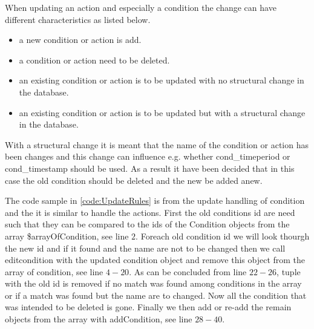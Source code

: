 When updating an action and especially a condition the change can have different characteristics as listed below.

\begin{itemize}
	\item a new condition or action is add.
	\item a condition or action need to be deleted.
	\item an existing condition or action is to be updated with no structural change in the database.
	\item an existing condition or action is to be updated but with a structural change in the database.
\end{itemize}

With a structural change it is meant that the name of the condition or action has been changes and this change can influence e.g. whether cond\_timeperiod or cond\_timestamp should be used. As a result it have been decided that in this case the old condition should be deleted and the new be added anew. 

The code sample in \ref{code:UpdateRules} is from the update handling of condition and the it is similar to handle the actions. First the old conditions id are need such that they can be compared to the ids of the Condition objects from the array \$arrayOfCondition, see line $2$. 
Foreach old condition id we will look thourgh the new id and if it found and the name are not to be changed then we call editcondition with the updated condition object and remove this object from the array of condition, see line $4-20$. As can be concluded from line $22-26$, tuple with the old id is removed if no match was found among conditions in the array or if a match was found but the name are to changed. Now all the condition that was intended to be deleted is gone. Finally we then add or re-add the remain objects from the array with addCondition, see line $28-40$.


